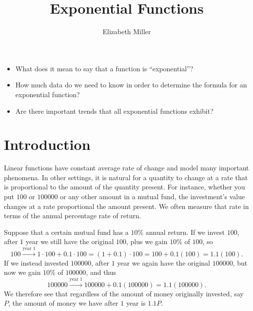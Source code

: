 \documentclass[nooutcomes]{ximera}
\author{Elizabeth Miller}
\title{Exponential Functions}
\begin{document}
\licenseAPC
\begin{abstract}
  
\end{abstract}
\maketitle



\begin{motivatingQuestions}\begin{itemize}
\item What does it mean to say that a function is ``exponential''?
\item How much data do we need to know in order to determine the formula for an exponential function?
\item Are there important trends that all exponential functions exhibit?
\end{itemize}\end{motivatingQuestions}



\section{Introduction}
Linear functions have constant average rate of change and model many important phenomena.  In other settings, it is natural for a quantity to change at a rate that is proportional to the amount of the quantity present.  For instance, whether you put \textdollar{}$100$ or \textdollar{}$100000$ or any other amount in a mutual fund, the investment's value changes at a rate proportional the amount present.  We often measure that rate in terms of the annual percentage rate of return.

Suppose that a certain mutual fund has a $10$\% annual return.  If we invest \textdollar{}$100$, after $1$ year we still have the original \textdollar{}$100$, plus we gain $10$\% of \textdollar{}$100$, so%
\begin{equation*}
100 \xrightarrow{\text{year } 1} 1\cdot 100 + 0.1 \cdot 100 = (1 + 0.1)\cdot 100 = 100 + 0.1(100) = 1.1(100)\text{.}
\end{equation*}
If we instead invested \textdollar{}$100000$, after $1$ year we again have the original \textdollar{}$100000$, but now we gain $10$\% of \textdollar{}$100000$, and thus%
\begin{equation*}
100000 \xrightarrow{\text{year } 1} 100000 + 0.1(100000) = 1.1(100000)\text{.}
\end{equation*}
We therefore see that regardless of the amount of money originally invested, say $P$, the amount of money we have after $1$ year is $1.1P$.
\end{document}
